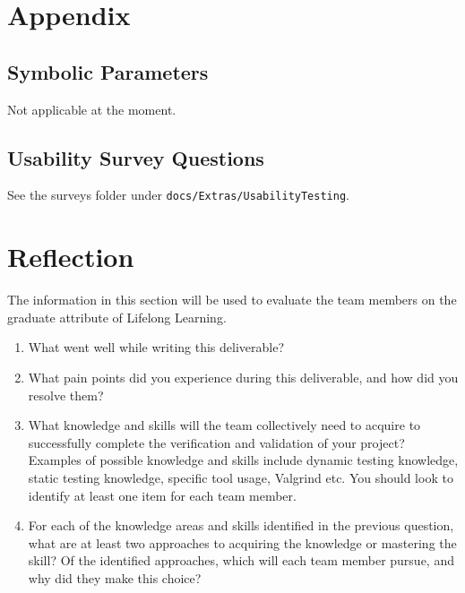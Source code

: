 \documentclass[12pt, titlepage]{article}
\begin{document}
\begin{appendices}

\section{Appendix}


\subsection{Symbolic Parameters}

Not applicable at the moment.

\subsection{Usability Survey Questions} \label{A.2}

See the surveys folder under \texttt{docs/Extras/UsabilityTesting}.

\newpage{}
\section{Reflection}


The information in this section will be used to evaluate the team members on the
graduate attribute of Lifelong Learning.



\begin{enumerate}
  \item What went well while writing this deliverable? 
  \item What pain points did you experience during this deliverable, and how
    did you resolve them?
  \item What knowledge and skills will the team collectively need to acquire to
  successfully complete the verification and validation of your project?
  Examples of possible knowledge and skills include dynamic testing knowledge,
  static testing knowledge, specific tool usage, Valgrind etc.  You should look to
  identify at least one item for each team member.
  \item For each of the knowledge areas and skills identified in the previous
  question, what are at least two approaches to acquiring the knowledge or
  mastering the skill?  Of the identified approaches, which will each team
  member pursue, and why did they make this choice?
\end{enumerate}


\end{appendices}
\end{document}
